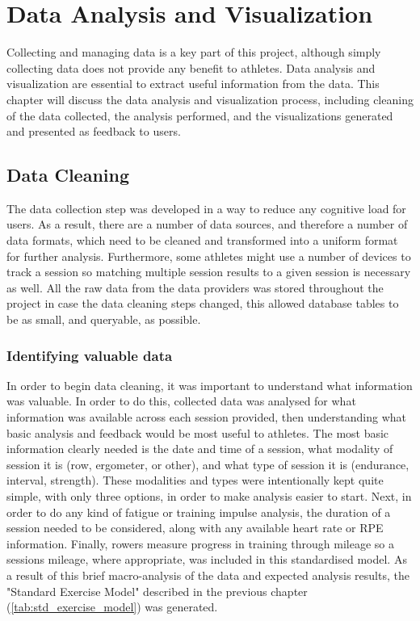 \chapter{Data Analysis and Visualization} \label{chap:data-analysis-viz}
Collecting and managing data is a key part of this project, although simply collecting data does not provide any benefit to athletes. Data analysis and visualization are essential to extract useful information from the data. This chapter will discuss the data analysis and visualization process, including cleaning of the data collected, the analysis performed, and the visualizations generated and presented as feedback to users.

\section{Data Cleaning}
The data collection step was developed in a way to reduce any cognitive load for users. As a result, there are a number of data sources, and therefore a number of data formats, which need to be cleaned and transformed into a uniform format for further analysis. Furthermore, some athletes might use a number of devices to track a session so matching multiple session results to a given session is necessary as well. All the raw data from the data providers was stored throughout the project in case the data cleaning steps changed, this allowed database tables to be as small, and queryable, as possible.
\subsection{Identifying valuable data}
In order to begin data cleaning, it was important to understand what information was valuable. In order to do this, collected data was analysed for what information was available across each session provided, then understanding what basic analysis and feedback would be most useful to athletes. The most basic information clearly needed is the date and time of a session, what modality of session it is (row, ergometer, or other), and what type of session it is (endurance, interval, strength). These modalities and types were intentionally kept quite simple, with only three options, in order to make analysis easier to start. Next, in order to do any kind of fatigue or training impulse analysis, the duration of a session needed to be considered, along with any available heart rate or RPE information. Finally, rowers measure progress in training through mileage so a sessions mileage, where appropriate, was included in this standardised model. As a result of this brief macro-analysis of the data and expected analysis results, the "Standard Exercise Model" described in the previous chapter (\autoref{tab:std_exercise_model}) was generated.

